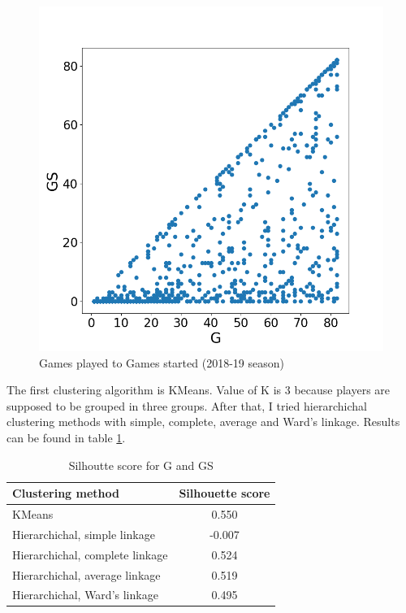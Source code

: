 \documentclass[a4paper]{article}
\begin{document}
\begin{figure}[h!]
\begin{center}
\includegraphics[scale=0.3]{g_to_gs.png}
\end{center}
\caption{Games played to Games started (2018-19 season)}
\label{plt:g_gs}
\end{figure}

The first clustering algorithm is KMeans. Value of K is 3 because players are supposed to be grouped in three groups. After that, I tried hierarchichal clustering methods with simple, complete, average and Ward's linkage. Results can be found in table \ref{tab:clust_score_k3}.

\begin{table}[!h]
\begin{center}
\begin{tabular}{|l|c|} \hline
\textbf{Clustering method} & \textbf{Silhouette score}  \\ \hline
KMeans & 0.550  \\ \hline
Hierarchichal, simple linkage & -0.007  \\ \hline
Hierarchichal, complete linkage & 0.524  \\ \hline
Hierarchichal, average linkage &  0.519  \\ \hline
Hierarchichal, Ward's linkage & 0.495  \\ \hline
\end{tabular}
\caption{Silhoutte score for G and GS}
\label{tab:clust_score_k3}
\end{center}
\end{table}
\end{document}
